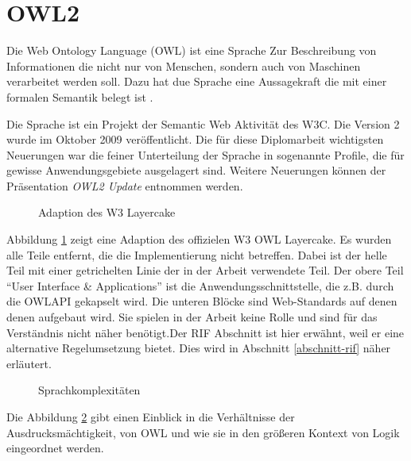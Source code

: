 \section{OWL2}
\label{abschnitt-owl2}

Die Web Ontology Language (OWL) ist eine Sprache Zur Beschreibung von Informationen die nicht nur von Menschen, sondern auch von Maschinen verarbeitet werden soll. Dazu hat due Sprache eine Aussagekraft die mit einer formalen Semantik belegt ist \cite{OWLWG}.

Die Sprache ist ein Projekt der Semantic Web Aktivität des W3C. Die Version 2 wurde im Oktober 2009 veröffentlicht. Die für diese Diplomarbeit wichtigsten Neuerungen war die feiner Unterteilung der Sprache in sogenannte Profile, die für gewisse Anwendungsgebiete ausgelagert sind. Weitere Neuerungen können der Präsentation \emph{OWL2 Update} \cite{Golbreich2008} entnommen werden.

\begin{figure}[htb]
	\caption{Adaption des W3 Layercake\cite{W3SWLayerCake}}
	\label{image-w3-layercake}
	\begin{center}
	\end{center}
\end{figure}


Abbildung \ref{image-w3-layercake} zeigt eine Adaption des offizielen W3 OWL Layercake\cite{W3SWLayerCake}. Es wurden alle Teile entfernt, die die Implementierung nicht betreffen. Dabei ist der helle Teil mit einer getrichelten Linie der in der Arbeit verwendete Teil. Der obere Teil ``User Interface \& Applications'' ist die Anwendungsschnittstelle, die z.B. durch die OWLAPI gekapselt wird. Die unteren Blöcke sind Web-Standards auf denen denen aufgebaut wird. Sie spielen in der Arbeit keine Rolle und sind für das Verständnis nicht näher benötigt.Der RIF Abschnitt ist hier erwähnt, weil er eine alternative Regelumsetzung bietet. Dies wird in Abschnitt \ref{abschnitt-rif} näher erläutert.

\begin{figure}[htb]
	\caption{Sprachkomplexitäten}
	\label{image-sprachhierarchie}
	\begin{center}
	\end{center}
\end{figure}

Die Abbildung \ref{image-sprachhierarchie} gibt einen Einblick in die Verhältnisse der Ausdrucksmächtigkeit, von OWL und wie sie in den größeren Kontext von Logik eingeordnet werden.

